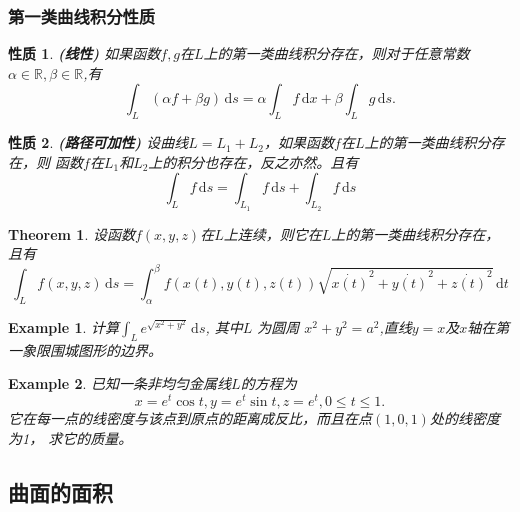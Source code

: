 \documentclass[a4paper,12pt]{article}
\newtheorem{example}{Example}             %
\newtheorem{theorem}{Theorem}[section]  %
\newtheorem{property}{性质}
\begin{document}
\begin{CJK}{UTF8}{gbsn}
    \subsubsection{第一类曲线积分性质}
    \begin{property}{\textbf{(线性)}}
        如果函数$f,g$在$L$上的第一类曲线积分存在，则对于任意常数$\alpha \in \mathbb{R},
        \beta \in \mathbb{R}$,有
        \[
            \int_L \left(\alpha f + \beta g\right)\, \mathrm{d}s = \alpha\int_L f \, \mathrm{d}x
            + \beta \int_L g \, \mathrm{d}s.
        \]
    \end{property}
    \begin{property}{\textbf{(路径可加性)}}
        设曲线$L = L_1 + L_2$，如果函数$f$在$L$上的第一类曲线积分存在，则
        函数$f$在$L_1$和$L_2$上的积分也存在，反之亦然。且有
        \[
            \int_L f \,\mathrm{d}s = \int_{L_1} f \, \mathrm{d}s + \int_{L_2} f \, \mathrm{d}s
            \]
    \end{property}
    \begin{theorem}
        设函数$f(x,y,z)$在$L$上连续，则它在$L$上的第一类曲线积分存在，且有
        \[
            \int_L f(x,y,z)\, \mathrm{d}s = 
            \int_{\alpha}^{\beta} f(x(t),y(t),z(t))\sqrt{{\dot{x(t)}}^2+{\dot{y(t)}}^2+{\dot{z(t)}}^2}\, \mathrm{d}t
            \]
    \end{theorem}

    \begin{example}
        计算$\displaystyle \int_L e^{\sqrt{x^2+y^2}}\,\mathrm{d}s$, 其中$L$ 为圆周
        $x^2+y^2=a^2$,直线$y=x$及$x$轴在第一象限围城图形的边界。
    \end{example}
    \begin{example}
        已知一条非均匀金属线$L$的方程为
        \[
            x = e^t\cos t, y = e^t\sin t, z = e^t, 0 \le t \le 1.
        \]
        它在每一点的线密度与该点到原点的距离成反比，而且在点$(1,0,1)$处的线密度为1，
        求它的质量。
    \end{example}

    \subsection{曲面的面积}

\end{CJK}
\end{document}
